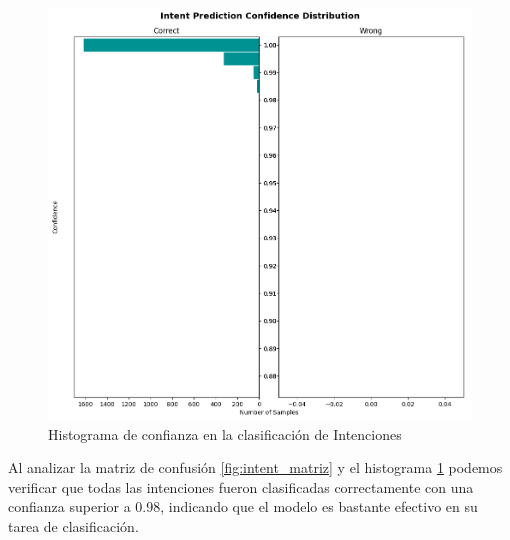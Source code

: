 \begin{figure}[h]
    \centering
    \includegraphics[width=\textwidth]{imagenes/cap5/intent_histogram.png}   
    \caption{Histograma de confianza en la clasificación de Intenciones}
    \label{fig:intent_histograma}
\end{figure}
Al analizar la matriz de confusión \ref{fig:intent_matriz} y el histograma \ref{fig:intent_histograma} podemos verificar que todas las intenciones fueron clasificadas correctamente con una confianza superior a 0.98, indicando que el modelo es bastante efectivo en su tarea de clasificación.

